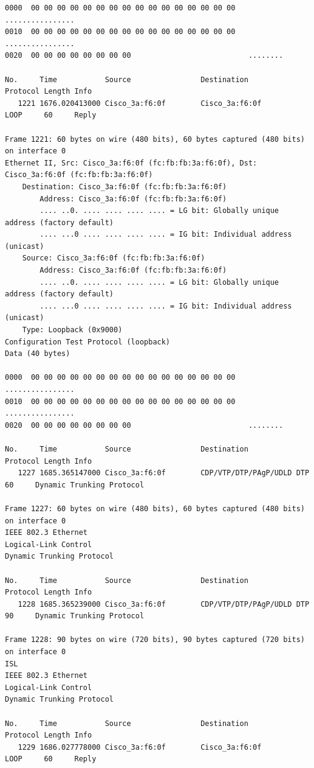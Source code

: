\documentclass[a4paper,11pt]{article}
\begin{document}
\begin{lstlisting}
0000  00 00 00 00 00 00 00 00 00 00 00 00 00 00 00 00   ................
0010  00 00 00 00 00 00 00 00 00 00 00 00 00 00 00 00   ................
0020  00 00 00 00 00 00 00 00                           ........

No.     Time           Source                Destination           Protocol Length Info
   1221 1676.020413000 Cisco_3a:f6:0f        Cisco_3a:f6:0f        LOOP     60     Reply

Frame 1221: 60 bytes on wire (480 bits), 60 bytes captured (480 bits) on interface 0
Ethernet II, Src: Cisco_3a:f6:0f (fc:fb:fb:3a:f6:0f), Dst: Cisco_3a:f6:0f (fc:fb:fb:3a:f6:0f)
    Destination: Cisco_3a:f6:0f (fc:fb:fb:3a:f6:0f)
        Address: Cisco_3a:f6:0f (fc:fb:fb:3a:f6:0f)
        .... ..0. .... .... .... .... = LG bit: Globally unique address (factory default)
        .... ...0 .... .... .... .... = IG bit: Individual address (unicast)
    Source: Cisco_3a:f6:0f (fc:fb:fb:3a:f6:0f)
        Address: Cisco_3a:f6:0f (fc:fb:fb:3a:f6:0f)
        .... ..0. .... .... .... .... = LG bit: Globally unique address (factory default)
        .... ...0 .... .... .... .... = IG bit: Individual address (unicast)
    Type: Loopback (0x9000)
Configuration Test Protocol (loopback)
Data (40 bytes)

0000  00 00 00 00 00 00 00 00 00 00 00 00 00 00 00 00   ................
0010  00 00 00 00 00 00 00 00 00 00 00 00 00 00 00 00   ................
0020  00 00 00 00 00 00 00 00                           ........

No.     Time           Source                Destination           Protocol Length Info
   1227 1685.365147000 Cisco_3a:f6:0f        CDP/VTP/DTP/PAgP/UDLD DTP      60     Dynamic Trunking Protocol

Frame 1227: 60 bytes on wire (480 bits), 60 bytes captured (480 bits) on interface 0
IEEE 802.3 Ethernet 
Logical-Link Control
Dynamic Trunking Protocol

No.     Time           Source                Destination           Protocol Length Info
   1228 1685.365239000 Cisco_3a:f6:0f        CDP/VTP/DTP/PAgP/UDLD DTP      90     Dynamic Trunking Protocol

Frame 1228: 90 bytes on wire (720 bits), 90 bytes captured (720 bits) on interface 0
ISL
IEEE 802.3 Ethernet 
Logical-Link Control
Dynamic Trunking Protocol

No.     Time           Source                Destination           Protocol Length Info
   1229 1686.027778000 Cisco_3a:f6:0f        Cisco_3a:f6:0f        LOOP     60     Reply


\end{lstlisting}
\end{document}
